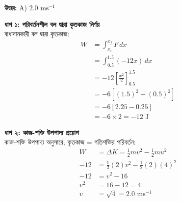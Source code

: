 \documentclass[12pt, a4paper]{article}
\begin{document}
\vspace{0.5em}
\begin{tcolorbox}[answerbox]
    \textbf{\color{success} উত্তর:} A) $2.0\text{ ms}^{-1}$
\end{tcolorbox}
\vspace{1em}

\begin{tcolorbox}[solutionbox={সমাধান (Solution)}]
    \noindent
    \textbf{ধাপ ১: পরিবর্তনশীল বল দ্বারা কৃতকাজ নির্ণয়} \\
    বাধাদানকারী বল দ্বারা কৃতকাজ:
    \begin{align*}
        W &= \int_{x_i}^{x_f} F \, dx \\
          &= \int_{0.5}^{1.5} (-12x) \, dx \\
          &= -12 \left[ \frac{x^2}{2} \right]_{0.5}^{1.5} \\
          &= -6 \left[ (1.5)^2 - (0.5)^2 \right] \\
          &= -6 [2.25 - 0.25] \\
          &= -6 \times 2 = -12\text{ J}
    \end{align*}
    
    \vspace{0.5em}
    \noindent\textbf{ধাপ ২: কাজ-শক্তি উপপাদ্য প্রয়োগ} \\
    কাজ-শক্তি উপপাদ্য অনুসারে, কৃতকাজ = গতিশক্তির পরিবর্তন:
    \begin{align*}
        W &= \Delta K = \frac{1}{2} m v^2 - \frac{1}{2} m u^2 \\
        -12 &= \frac{1}{2} (2) v^2 - \frac{1}{2} (2) (4)^2 \\
        -12 &= v^2 - 16 \\
        v^2 &= 16 - 12 = 4 \\
        v &= \sqrt{4} = \mathbf{2.0}\text{ ms}^{-1}
    \end{align*}
\end{tcolorbox}

\newpage
\end{document}
